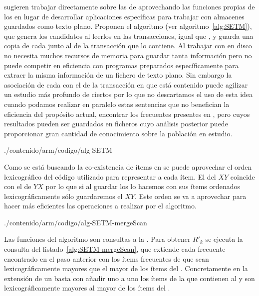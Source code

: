 \citet{HoutsmaSwami-SETMofAR-1993} sugieren trabajar directamente sobre las \dbs de \transacciones aprovechando las funciones propias de los \dbms en lugar de desarrollar aplicaciones específicas para trabajar con almacenes \D guardados como texto plano. Proponen el algoritmo  (ver algoritmo~\ref{alg:SETM}), que genera los candidatos al leerlos en las transacciones, igual que , y guarda una copia de cada \itemset junto al \TID de la transacción que lo contiene. Al trabajar con \DB en disco no necesita muchos recursos de memoria para guardar tanta información pero no puede competir en eficiencia con programas preparados específicamente para extraer la misma información de un fichero de texto plano. Sin embargo la asociación de cada \itemset con el \TID de la transacción en que está contenido puede agilizar un estudio más profundo de ciertos \itemsets por lo que no descartamos el uso de esta idea cuando podamos realizar en paralelo estas sentencias que no benefician la eficiencia del propósito actual, encontrar los \itemsets frecuentes presentes en \D, pero cuyos resultados pueden ser guardados en ficheros cuyo análisis posterior puede proporcionar gran cantidad de conocimiento sobre la población en estudio. 


                {./contenido/arm/codigo/alg-SETM}

Como se está buscando la co-existencia de ítems en \transacciones se puede aprovechar el orden lexicográfico del código utilizado para representar a cada ítem. El \soporte del \itemset $XY$ coincide con el de $YX$ por lo que si al guardar los \itemsets lo hacemos con sus ítems ordenados lexicográficamente sólo guardaremos el \itemset $XY$. Este orden se va a aprovechar para hacer más eficientes las operaciones a realizar por el algoritmo.


                {./contenido/arm/codigo/alg-SETM-mergeScan}
                
Las funciones del algoritmo son consultas a la \db. Para obtener $R'_k$ se ejecuta la consulta del listado~\ref{alg:SETM-mergeScan}, que extiende cada \kitemset frecuente encontrado en el paso anterior con los ítems frecuentes de \D que sean lexicográficamente mayores que el mayor de los ítems del \kitemset. Concretamente en la extensión de un \kitemset basta con añadir uno a uno los ítems de la \transaccion que contienen al \kitemset y son lexicográficamente mayores al mayor de los ítems del \kitemset.


